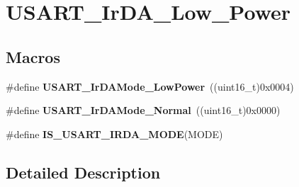 \hypertarget{group___u_s_a_r_t___ir_d_a___low___power}{\section{U\-S\-A\-R\-T\-\_\-\-Ir\-D\-A\-\_\-\-Low\-\_\-\-Power}
\label{group___u_s_a_r_t___ir_d_a___low___power}
}
\subsection*{Macros}
\begin{DoxyCompactItemize}
\item 
\hypertarget{group___u_s_a_r_t___ir_d_a___low___power_ga00c2635d0e6ca1a5b158f1c1673e862f}{\#define {\bfseries U\-S\-A\-R\-T\-\_\-\-Ir\-D\-A\-Mode\-\_\-\-Low\-Power}~((uint16\-\_\-t)0x0004)}\label{group___u_s_a_r_t___ir_d_a___low___power_ga00c2635d0e6ca1a5b158f1c1673e862f}

\item 
\hypertarget{group___u_s_a_r_t___ir_d_a___low___power_ga796cd5451deb896741206986bd6d03e6}{\#define {\bfseries U\-S\-A\-R\-T\-\_\-\-Ir\-D\-A\-Mode\-\_\-\-Normal}~((uint16\-\_\-t)0x0000)}\label{group___u_s_a_r_t___ir_d_a___low___power_ga796cd5451deb896741206986bd6d03e6}

\item 
\#define {\bfseries I\-S\-\_\-\-U\-S\-A\-R\-T\-\_\-\-I\-R\-D\-A\-\_\-\-M\-O\-D\-E}(M\-O\-D\-E)
\end{DoxyCompactItemize}


\subsection{Detailed Description}


